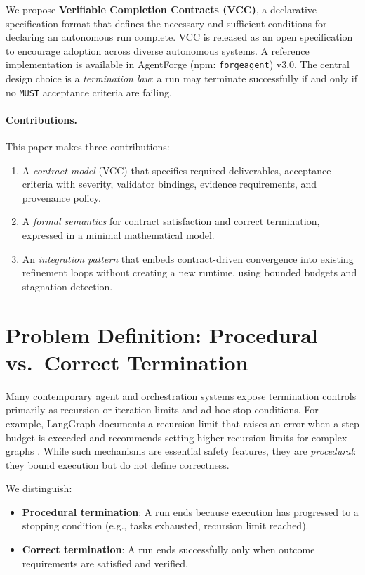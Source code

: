 \documentclass[11pt]{article}
\begin{document}
We propose \textbf{Verifiable Completion Contracts (VCC)}, a declarative specification format that defines the necessary and sufficient conditions for declaring an autonomous run complete. VCC is released as an open specification to encourage adoption across diverse autonomous systems. A reference implementation is available in AgentForge (npm: \texttt{forgeagent}) v3.0. The central design choice is a \emph{termination law}: a run may terminate successfully if and only if no \texttt{MUST} acceptance criteria are failing.

\paragraph{Contributions.} This paper makes three contributions:
\begin{enumerate}[leftmargin=*]
  \item A \emph{contract model} (VCC) that specifies required deliverables, acceptance criteria with severity, validator bindings, evidence requirements, and provenance policy.
  \item A \emph{formal semantics} for contract satisfaction and correct termination, expressed in a minimal mathematical model.
  \item An \emph{integration pattern} that embeds contract-driven convergence into existing refinement loops without creating a new runtime, using bounded budgets and stagnation detection.
\end{enumerate}

\section{Problem Definition: Procedural vs.\ Correct Termination}
Many contemporary agent and orchestration systems expose termination controls primarily as recursion or iteration limits and ad hoc stop conditions. For example, LangGraph documents a recursion limit that raises an error when a step budget is exceeded and recommends setting higher recursion limits for complex graphs \cite{langgraph_recursion_limit_js,langgraph_recursion_limit_py,langgraph_graph_api_py}. While such mechanisms are essential safety features, they are \emph{procedural}: they bound execution but do not define correctness.

We distinguish:
\begin{itemize}[leftmargin=*]
  \item \textbf{Procedural termination}: A run ends because execution has progressed to a stopping condition (e.g., tasks exhausted, recursion limit reached).
  \item \textbf{Correct termination}: A run ends successfully only when outcome requirements are satisfied and verified.
\end{itemize}
\end{document}
